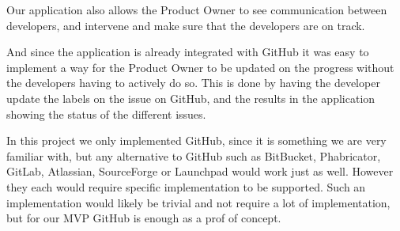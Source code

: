 Our application also allows the Product Owner to see communication between developers, and intervene and make sure that the developers are on track.

And since the application is already integrated with GitHub it was easy to implement a way for the Product Owner to be updated on the progress without the developers having to actively do so.
This is done by having the developer update the labels on the issue on GitHub, and the results in the application showing the status of the different issues. 

In this project we only implemented GitHub, since it is something we are very familiar with, but any alternative to GitHub such as BitBucket, Phabricator, GitLab, Atlassian, SourceForge or Launchpad would work just as well. However they each would require specific implementation to be supported.
Such an implementation would likely be trivial and not require a lot of implementation, but for our MVP GitHub is enough as a prof of concept.